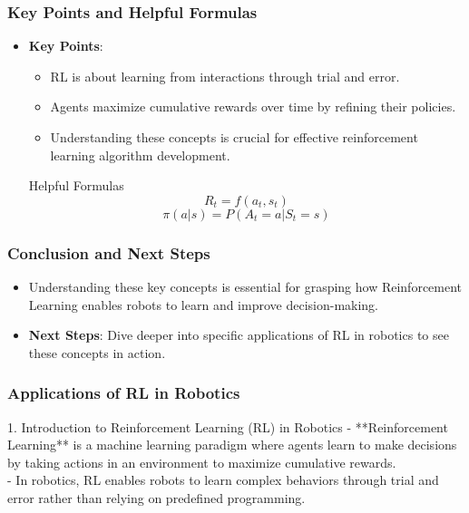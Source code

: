 \documentclass{beamer}
\begin{document}
\begin{frame}[fragile]
    \frametitle{Key Points and Helpful Formulas}
    
    \begin{itemize}
        \item \textbf{Key Points}:
            \begin{itemize}
                \item RL is about learning from interactions through trial and error.
                \item Agents maximize cumulative rewards over time by refining their policies.
                \item Understanding these concepts is crucial for effective reinforcement learning algorithm development.
            \end{itemize}
        
        \begin{block}{Helpful Formulas}
            \begin{equation}
                R_t = f(a_t, s_t)
            \end{equation}
            \begin{equation}
                \pi(a|s) = P(A_t = a | S_t = s)
            \end{equation}
        \end{block}
    \end{itemize}
\end{frame}

\begin{frame}[fragile]
    \frametitle{Conclusion and Next Steps}

    \begin{itemize}
        \item Understanding these key concepts is essential for grasping how Reinforcement Learning enables robots to learn and improve decision-making.
        \item \textbf{Next Steps}: Dive deeper into specific applications of RL in robotics to see these concepts in action.
    \end{itemize}
\end{frame}

\begin{frame}[fragile]
    \frametitle{Applications of RL in Robotics}
    \begin{block}{1. Introduction to Reinforcement Learning (RL) in Robotics}
        - **Reinforcement Learning** is a machine learning paradigm where agents learn to make decisions by taking actions in an environment to maximize cumulative rewards.\\
        - In robotics, RL enables robots to learn complex behaviors through trial and error rather than relying on predefined programming.
    \end{block}
\end{frame}
\end{document}
